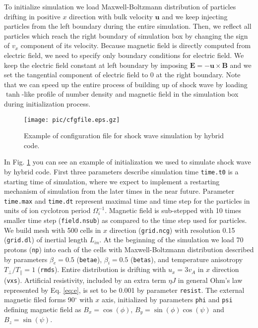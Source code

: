 \documentclass[oneside,branding,toc,article]{satdoc}
\newcommand{\mbf}[1]{\mathbf{#1}}              %
\begin{document}
To initialize simulation we load Maxwell-Boltzmann distribution of particles
drifting in positive $x$ direction with bulk velocity $\mbf{u}$ and we keep
injecting particles from the left boundary during the entire simulation.  Then,
we reflect all particles which reach the right boundary of simulation box by
changing the sign of $v_x$ component of its velocity. Because magnetic field is
directly computed from electric field, we need to specify only boundary
conditions for electric field. We keep the electric field constant at left
boundary by imposing $\mathbf{E} = - \mathbf{u} \times \mathbf{B}$ and we set
the tangential component of electric field to 0 at the right boundary.  Note
that we can speed up the entire process of building up of shock wave by loading
$\tanh$-like profile of number density and magnetic field in the
simulation box during initialization process.

\begin{figure}[!h]
  \centering
  \texttt{[image: pic/cfgfile.eps.gz]}
  \caption{Example of configuration file for shock wave simulation by hybrid
    code.}
  \label{fig:cfg}
\end{figure}

In Fig. \ref{fig:cfg} you can see an example of initialization we used to
simulate shock wave by hybrid code.  First three parameters describe simulation
time \texttt{time.t0} is a starting time of simulation, where we expect to
implement a restarting mechanism of simulation from the later times in the near
future.  Parameter \texttt{time.max} and \texttt{time.dt} represent maximal
time and time step for the particles in units of ion cyclotron period
$\Omega_i^{-1}$.  Magnetic field is sub-stepped with 10 times smaller time step
(\texttt{field.nsub}) as compared to the time step used for particles.  We
build mesh with 500 cells in $x$ direction (\texttt{grid.ncg}) with resolution
0.15 (\texttt{grid.dl}) of inertial length $L_{in}$.  At the beginning of the
simulation we load 70 protons (\texttt{np}) into each of the cells with
Maxwell-Boltzmann distribution described by parameters $\beta_e = 0.5$
(\texttt{betae}), $\beta_i = 0.5$ (\texttt{betas}), and temperature anisotropy
$T_\perp / T_\parallel = 1$ (\texttt{rmds}).  Entire distribution is drifting
with $u_x = 3 v_A$ in $x$ direction (\texttt{vxs}).  Artificial resistivity,
included by an extra term $\eta J$ in general Ohm's law represented by
Eq. \ref{eq:e}, is set to be 0.001 by parameter \texttt{resist}.  The external
magnetic filed forms 90$^\circ$ with $x$ axis, initialized by parameters
\texttt{phi} and \texttt{psi} defining magnetic field as $B_x = \cos (\phi)$,
$B_y = \sin (\phi) \cos (\psi)$ and $B_z = \sin (\psi)$.
\end{document}
